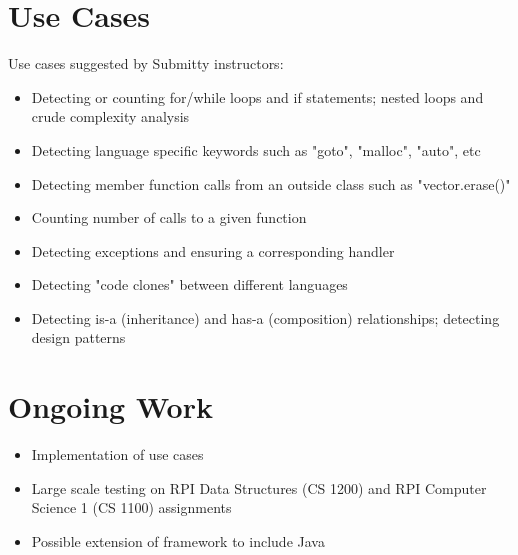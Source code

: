 \documentclass[thesis]{hmcposter}
\begin{document}
\begin{poster}
\columnbreak
\section{Use Cases}
Use cases suggested by Submitty instructors:
\begin{itemize}

%

\item{Detecting or counting for/while loops and if statements; nested loops and crude complexity analysis}
\item{Detecting language specific keywords such as "goto", "malloc", "auto", etc}	
\item{Detecting member function calls from an outside class such as "vector.erase()"}
\item{Counting number of calls to a given function}
\item{Detecting exceptions and ensuring a corresponding handler}
\item{Detecting "code clones" between different languages}
\item{Detecting is-a (inheritance) and has-a (composition) relationships; detecting design patterns}
\end{itemize}

\section{Ongoing Work}
\begin{itemize}
\item{Implementation of use cases}
\item{Large scale testing on RPI Data Structures (CS 1200) and RPI Computer Science 1 (CS 1100) assignments}
\item{Possible extension of framework to include Java}
\end{itemize}



\end{poster}
\end{document}
